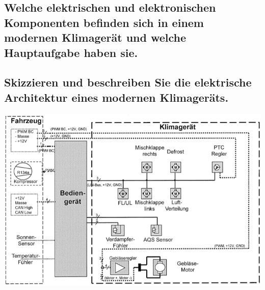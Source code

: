 \subsection{Welche elektrischen und elektronischen Komponenten befinden sich in einem modernen Klimager\"at und welche Hauptaufgabe haben sie.}

\subsection{Skizzieren und beschreiben Sie die elektrische Architektur eines modernen Klimager\"ats.}
\includegraphics[width=\textwidth]{pics/architekturKlimaanlage}
